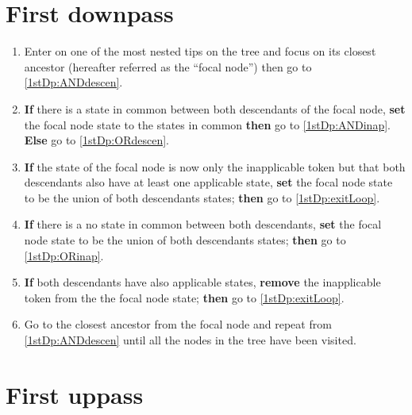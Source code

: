 \documentclass[a4paper,12pt]{article}
\begin{document}


\section{First downpass} \label{1stDp}

\begin{enumerate}
    \item Enter on one of the most nested tips on the tree and focus on its closest ancestor (hereafter referred as the ``focal node'') then go to \ref{1stDp:ANDdescen}.
    \item \label{1stDp:ANDdescen} \textbf{If} there is a state in common between both descendants of the focal node, \textbf{set} the focal node state to the states in common \textbf{then} go to \ref{1stDp:ANDinap}. \textbf{Else} go to \ref{1stDp:ORdescen}.
    \item \label{1stDp:ANDinap} \textbf{If} the state of the focal node is now only the inapplicable token but that both descendants also have at least one applicable state, \textbf{set} the focal node state to be the union of both descendants states; \textbf{then} go to \ref{1stDp:exitLoop}.
    \item \label{1stDp:ORdescen} \textbf{If} there is a no state in common between both descendants, \textbf{set} the focal node state to be the union of both descendants states; \textbf{then} go to \ref{1stDp:ORinap}.
    \item \label{1stDp:ORinap} \textbf{If} both descendants have also applicable states, \textbf{remove} the inapplicable token from the the focal node state; \textbf{then} go to \ref{1stDp:exitLoop}.
    \item \label{1stDp:exitLoop} Go to the closest ancestor from the focal node and repeat from \ref{1stDp:ANDdescen} until all the nodes in the tree have been visited.
\end{enumerate}

\section{First uppass} \label{1stUp}
\end{document}
